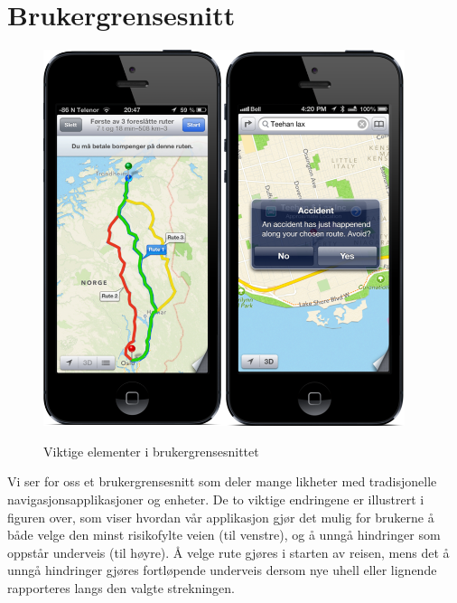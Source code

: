 \documentclass[a4paper,norsk,oneside]{book}
\begin{document}
%
%

\section{Brukergrensesnitt}
\label{sec:Brukergrensesnitt}

\begin{figure}[H]
\centering
\includegraphics[scale=0.5]{figs/appconcept.png}
\label{fig:appconcept}
\caption{Viktige elementer i brukergrensesnittet}
\end{figure}

Vi ser for oss et brukergrensesnitt som deler mange likheter med tradisjonelle navigasjonsapplikasjoner og enheter. De to viktige endringene er illustrert i figuren over, som viser hvordan vår applikasjon gjør det mulig for brukerne å både velge den minst risikofylte veien (til venstre), og å unngå hindringer som oppstår underveis (til høyre). Å velge rute gjøres i starten av reisen, mens det å unngå hindringer gjøres fortløpende underveis dersom nye uhell eller lignende rapporteres langs den valgte strekningen.
\end{document}
